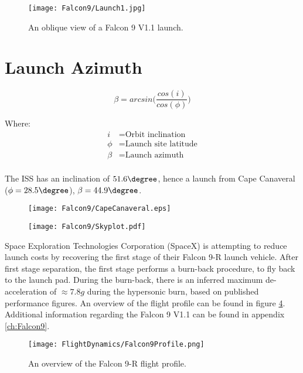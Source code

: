 \begin{figure}[!htb] 
    \centering
    \texttt{[image: Falcon9/Launch1.jpg]}
    \caption{An oblique view of a Falcon 9 V1.1 launch. \cite{SpaceXFalcon9}}
    \label{fig:Falcon9Launch}
\end{figure}


\section{Launch Azimuth}

\begin{equation}
\beta = arcsin \Big(\frac{cos(i)}{cos(\phi)}\Big)
\end{equation}

Where:
\begin{align*}
 i &= \text{Orbit inclination}\\
 \phi &= \text{Launch site latitude}\\
 \beta &= \text{Launch azimuth}\\
\end{align*}

\cite{LaunchDesign}

The \ac{ISS} has an inclination of $51.6\degree$, hence a launch from Cape Canaveral ($\phi = 28.5\degree$), $\beta=44.9\degree$.


\begin{figure}[!htb] 
    \centering
    \texttt{[image: Falcon9/CapeCanaveral.eps]}
    \caption{}
    \label{fig:LaunchPath}
\end{figure}




\begin{figure}[!htb] 
    \centering
    \texttt{[image: Falcon9/Skyplot.pdf]}
    \caption{}
    \label{fig:Skyplot}
\end{figure}



Space Exploration Technologies Corporation (SpaceX) is attempting to reduce launch costs by recovering the first stage of their Falcon 9-R launch vehicle. After first stage separation, the first stage performs a burn-back procedure, to fly back to the launch pad. During the burn-back, there is an inferred maximum de-acceleration of $\approx 7.8 g$ during the hypersonic burn, based on published performance figures. An overview of the flight profile can be found in figure \ref{fig:Falcon9Profile}. Additional information regarding the Falcon 9 V1.1 can be found in appendix \ref{ch:Falcon9}.

\begin{figure}[!htb] 
    \centering
    \texttt{[image: FlightDynamics/Falcon9Profile.png]} 
    \caption{An overview of the Falcon 9-R flight profile.}
    \label{fig:Falcon9Profile}
\end{figure}



